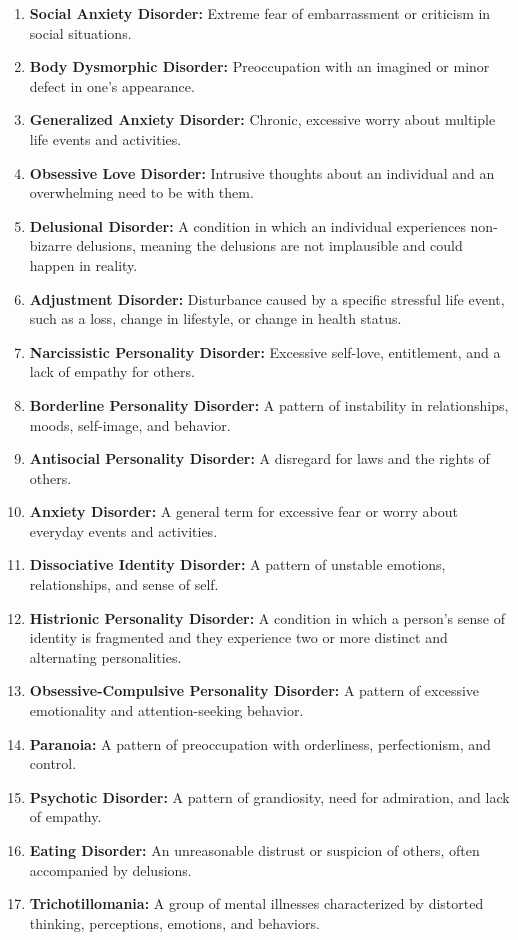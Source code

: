 \documentclass[12pt]{book}  %
\begin{document}
\begin{enumerate}
    \item \textbf{Social Anxiety Disorder:} Extreme fear of embarrassment or criticism in social situations.
    \item \textbf{Body Dysmorphic Disorder:} Preoccupation with an imagined or minor defect in one’s appearance.
    \item \textbf{Generalized Anxiety Disorder:} Chronic, excessive worry about multiple life events and activities.
    \item \textbf{Obsessive Love Disorder:} Intrusive thoughts about an individual and an overwhelming need to be with them.
    \item \textbf{Delusional Disorder:} A condition in which an individual experiences non-bizarre delusions, meaning the delusions are not implausible and could happen in reality.
    \item \textbf{Adjustment Disorder:} Disturbance caused by a specific stressful life event, such as a loss, change in lifestyle, or change in health status.
    \item \textbf{Narcissistic Personality Disorder:} Excessive self-love, entitlement, and a lack of empathy for others.
    \item \textbf{Borderline Personality Disorder:} A pattern of instability in relationships, moods, self-image, and behavior.
    \item \textbf{Antisocial Personality Disorder:} A disregard for laws and the rights of others.
    \item \textbf{Anxiety Disorder:} A general term for excessive fear or worry about everyday events and activities.
    \item \textbf{Dissociative Identity Disorder:} A pattern of unstable emotions, relationships, and sense of self.
    \item \textbf{Histrionic Personality Disorder:} A condition in which a person's sense of identity is fragmented and they experience two or more distinct and alternating personalities.
    \item \textbf{Obsessive-Compulsive Personality Disorder:} A pattern of excessive emotionality and attention-seeking behavior.
    \item \textbf{Paranoia:} A pattern of preoccupation with orderliness, perfectionism, and control.
    \item \textbf{Psychotic Disorder:} A pattern of grandiosity, need for admiration, and lack of empathy.
    \item \textbf{Eating Disorder:} An unreasonable distrust or suspicion of others, often accompanied by delusions.
    \item \textbf{Trichotillomania:} A group of mental illnesses characterized by distorted thinking, perceptions, emotions, and behaviors.
\end{enumerate}
\end{document}

